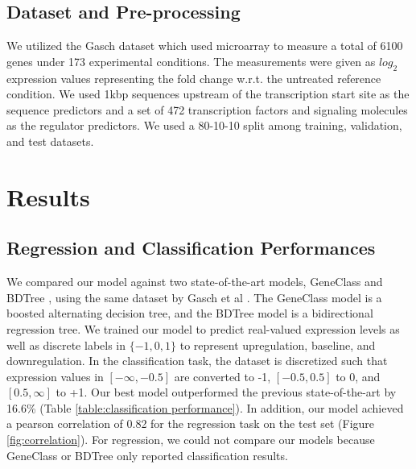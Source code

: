\documentclass{article}
\begin{document}
\subsection{Dataset and Pre-processing}

We utilized the Gasch \cite{Gasch:2000wl} dataset which used microarray to measure a total of 6100 genes under 173 experimental conditions. The measurements were given as $log_2$ expression values representing the fold change w.r.t. the untreated reference condition. We used 1kbp sequences upstream of the transcription start site as the sequence predictors and a set of 472 transcription factors and signaling molecules as the regulator predictors. We used a 80-10-10 split among training, validation, and test datasets.




\section{Results}

\subsection{Regression and Classification Performances}
We compared our model against two state-of-the-art models, GeneClass \cite{Middendorf:2004gta} and BDTree \cite{Ruan:2006hl}, using the same dataset by Gasch et al \cite{Gasch:2000wl}. The GeneClass model is a boosted alternating decision tree, and the BDTree model is a bidirectional regression tree. We trained our model to predict real-valued expression levels as well as discrete labels in $\{-1,0,1\}$ to represent upregulation, baseline, and downregulation. In the classification task, the dataset is discretized such that expression values in $[-\infty,-0.5]$ are converted to -1, $[-0.5,0.5]$ to 0, and $[0.5,\infty]$ to +1. Our best model outperformed the previous state-of-the-art by 16.6\% (Table \ref{table:classification performance}). In addition, our model achieved a pearson correlation of 0.82 for the regression task on the test set (Figure \ref{fig:correlation}). For regression, we could not compare our models because GeneClass or BDTree only reported classification results.
\end{document}

